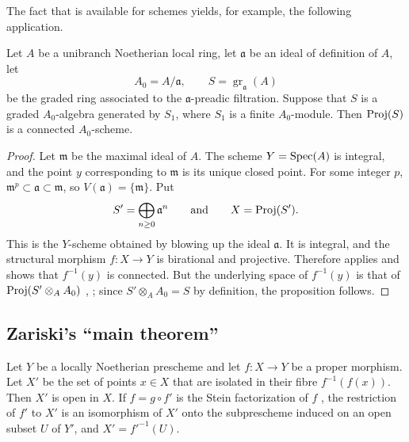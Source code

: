 The fact that  is available for schemes yields, for
example, the following application.

\begin{proposition}[4.3.13]
\label{III.4.3.13}
Let $A$ be a unibranch Noetherian local ring, let $\mathfrak{a}$ be
an ideal of definition of $A$, let
\[
  A_0=A/\mathfrak{a},
  \qquad
  S=\operatorname{gr}_{\mathfrak{a}}(A)
\]
be the graded ring associated to the $\mathfrak{a}$-preadic
filtration.  Suppose that $S$ is a graded $A_0$-algebra generated by
$S_1$, where $S_1$ is a finite $A_0$-module.  Then $\operatorname{Proj}(S)$ is a
connected $A_0$-scheme.
\end{proposition}

\begin{proof}
Let $\mathfrak{m}$ be the maximal ideal of $A$.  The scheme
$Y=\operatorname{Spec}(A)$ is integral, and the point $y$ corresponding to
$\mathfrak{m}$ is its unique closed point.  For some integer $p$, $\mathfrak{m}^p\subset\mathfrak{a}\subset\mathfrak{m}$,
so $V(\mathfrak{a})=\{\mathfrak{m}\}$.  Put
\[
  S'=\bigoplus_{n\geq0}\mathfrak{a}^n
  \qquad\text{and}\qquad
  X=\operatorname{Proj}(S').
\]
This is the $Y$-scheme obtained by blowing up the ideal
$\mathfrak{a}$.  It is integral, and the structural morphism
$f:X\to Y$ is birational  and projective.
Therefore  applies and shows that $f^{-1}(y)$ is
connected.  But the underlying space of $f^{-1}(y)$ is that of $\operatorname{Proj}(S'\otimes_A A_0)$
, ; since
$S'\otimes_AA_0=S$ by definition, the proposition follows.
\end{proof}


\subsection{Zariski's ``main theorem''}
\label{subsection:III.4.4}

\begin{proposition}[4.4.1]
\label{III.4.4.1}
Let $Y$ be a locally Noetherian prescheme and let $f:X\to Y$ be a
proper morphism.  Let $X'$ be the set of points $x\in X$ that are
isolated in their fibre $f^{-1}(f(x))$.  Then $X'$ is open in $X$.
If $f=g\circ f'$
is the Stein factorization of $f$ , the restriction
of $f'$ to $X'$ is an isomorphism of $X'$ onto the subprescheme
induced on an open subset $U$ of $Y'$, and
$X'=f'^{-1}(U)$.
\end{proposition}

